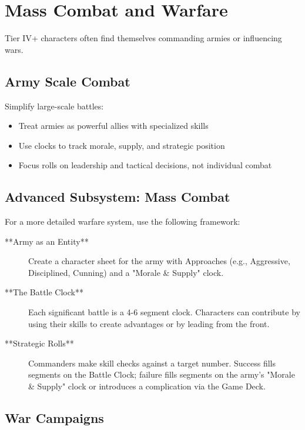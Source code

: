 \section{Mass Combat and Warfare}

Tier IV+ characters often find themselves commanding armies or influencing wars.

\subsection*{Army Scale Combat}

Simplify large-scale battles:
\begin{itemize}
    \item Treat armies as powerful allies with specialized skills
    \item Use clocks to track morale, supply, and strategic position
    \item Focus rolls on leadership and tactical decisions, not individual combat
\end{itemize}

\subsection*{Advanced Subsystem: Mass Combat}

For a more detailed warfare system, use the following framework:

\begin{description}
    \item[**Army as an Entity**] Create a character sheet for the army with Approaches (e.g., Aggressive, Disciplined, Cunning) and a "Morale & Supply" clock.
    \item[**The Battle Clock**] Each significant battle is a 4-6 segment clock. Characters can contribute by using their skills to create advantages or by leading from the front.
    \item[**Strategic Rolls**] Commanders make skill checks against a target number. Success fills segments on the Battle Clock; failure fills segments on the army's "Morale & Supply" clock or introduces a complication via the Game Deck.
\end{description}

\subsection*{War Campaigns}

